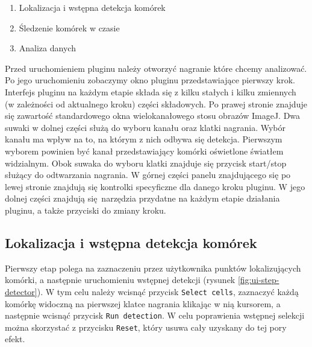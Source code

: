 \documentclass[declaration,shortabstract,mgr]{iithesis}
\begin{document}
\begin{enumerate}
  \item Lokalizacja i wstępna detekcja komórek
  \item Śledzenie komórek w czasie
  \item Analiza danych
\end{enumerate}

Przed uruchomieniem pluginu należy otworzyć nagranie które chcemy analizować. Po jego uruchomieniu zobaczymy okno pluginu przedstawiające pierwszy krok.
Interfejs pluginu na każdym etapie składa się z kilku stałych i kilku zmiennych (w zależności od aktualnego kroku) części składowych.
Po prawej stronie znajduje się zawartość standardowego okna wielokanałowego stosu obrazów ImageJ.
Dwa suwaki w dolnej części służą do wyboru kanału oraz klatki nagrania.
Wybór kanału ma wpływ na to, na którym z nich odbywa się detekcja.
Pierwszym wyborem powinien być kanał przedstawiający komórki oświetlone światłem widzialnym.
Obok suwaka do wyboru klatki znajduje się przycisk start/stop służący do odtwarzania nagrania.
W górnej części panelu znajdującego się po lewej stronie znajdują się kontrolki specyficzne dla danego kroku pluginu. W jego dolnej części znajdują się narzędzia przydatne na każdym etapie działania pluginu, a także przyciski do zmiany kroku.


\subsection{Lokalizacja i wstępna detekcja komórek}

Pierwszy etap polega na zaznaczeniu przez użytkownika punktów lokalizujących komórki, a następnie uruchomieniu wstępnej detekcji (rysunek \ref{fig:ui-step-detector}).
W tym celu należy wcisnąć przycisk \texttt{Select cells}, zaznaczyć każdą komórkę widoczną na pierwszej klatce nagrania klikając w nią kursorem, a następnie wcisnąć przycisk \texttt{Run detection}.
W celu poprawienia wstępnej selekcji można skorzystać z przycisku \texttt{Reset}, który usuwa cały uzyskany do tej pory efekt.
\end{document}

